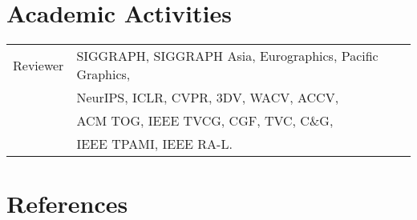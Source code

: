 \documentclass[letterpaper,10pt]{article} %
\newcommand{\blankline}{\quad\pagebreak[2]}
\begin{document}
{\section{Academic Activities}


\begin{tabular}{rl}
Reviewer & SIGGRAPH, SIGGRAPH Asia, Eurographics, Pacific Graphics, \\
  & NeurIPS, ICLR, CVPR, 3DV, WACV, ACCV, \\
  & ACM TOG, IEEE TVCG, CGF, TVC, C\&G, \\
  & IEEE TPAMI, IEEE RA-L. \\
\end{tabular}
\blankline


\section{References}

\renewcommand{\arraystretch}{1.5}
\begin{tabular}{lll}


\end{tabular}}
\end{document}
